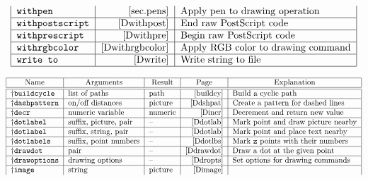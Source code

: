 \begin{table}[htp]
$$\begin{tabular}{|l|r|l|}
\tt \verb|withpen|&          \pageref{sec.pens}&
        Apply pen to drawing operation\\\hline
\tt \verb|withpostscript|&   \pageref{Dwithpost}&
        End raw PostScript code\\\hline
\tt \verb|withprescript|&    \pageref{Dwithpre}&
        Begin raw PostScript code\\\hline
\tt \verb|withrgbcolor|&     \pageref{Dwithrgbcolor}&
        Apply RGB color to drawing command\\\hline
\tt \verb|write to|&         \pageref{Dwrite}&
        Write string to file\\\hline
\end{tabular}
$$
%
\label{cmdtab}
\end{table}


\begin{table}[htp]
\caption{Function-Like Macros}
$$\begin{tabular}{|l|l|l|r|l|}
\hline
\multicolumn1{|c}{Name}&  \multicolumn1{|c}{Arguments}&
        \multicolumn1{|c}{Result}&  \multicolumn1{|c}{Page}&
        \multicolumn1{|c|}{Explanation}\\
\hline
\hline
\pl\tt \verb|buildcycle|&       list of paths&  path&   \pageref{buildcy}&
        Build a cyclic path\\\hline
\pl\tt \verb|dashpattern|&      on/off distances&       picture&        \pageref{Ddshpat}&
        Create a pattern for dashed lines\\\hline
\pl\tt \verb|decr|&     numeric variable&       numeric&        \pageref{Dincr}&
        Decrement and return new value\\\hline
\pl\tt \verb|dotlabel|& suffix, picture, pair&  --&     \pageref{Ddotlab}&
        Mark point and draw picture nearby\\\hline
\pl\tt \verb|dotlabel|& suffix, string, pair&   --&     \pageref{Ddotlab}&
        Mark point and place text nearby\\\hline
\pl\tt \verb|dotlabels|&        suffix, point numbers&  --&     \pageref{Ddotlbs}&
        Mark {\tt z} points with their numbers\\\hline
\pl\tt \verb|drawdot|&          pair&       --&     \pageref{Ddrawdot}&
        Draw a dot at the given point\\\hline
\pl\tt \verb|drawoptions|&      drawing options&        --&     \pageref{Ddropts}&
        Set options for drawing commands\\\hline
\pl\tt \verb|image|&              string&       picture&      \pageref{Dimage}&

\end{tabular}$$
\end{table}

